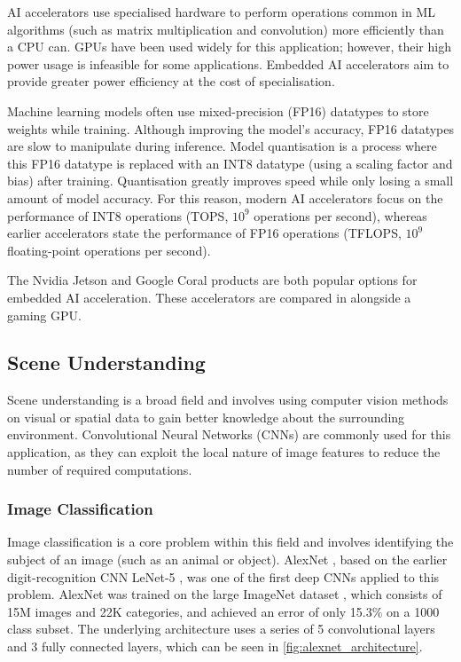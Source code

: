 AI accelerators use specialised hardware to perform operations common in ML algorithms (such as matrix multiplication
and convolution) more efficiently than a CPU can. GPUs have been used widely for this application; however, their high
power usage is infeasible for some applications. Embedded AI accelerators aim to provide greater power efficiency
at the cost of specialisation.

Machine learning models often use mixed-precision (FP16) datatypes to store weights while training.
Although improving the model's accuracy, FP16 datatypes are slow to manipulate during inference.
Model quantisation \cite{jacobQuantizationTrainingNeural2017} is a process where this FP16 datatype is replaced with an
INT8 datatype (using a scaling factor and bias) after training.
Quantisation greatly improves speed while only losing a small amount of model accuracy.
For this reason, modern AI accelerators focus on the performance of INT8 operations (TOPS, $10^9$ operations per second),
whereas earlier accelerators state the performance of FP16 operations (TFLOPS, $10^9$ floating-point
operations per second).

The Nvidia Jetson and Google Coral products are both popular options for embedded AI acceleration. These accelerators are compared
in  alongside a gaming GPU. 

\pagebreak
\subsection{Scene Understanding}
Scene understanding is a broad field and involves using computer vision methods
on visual or spatial data to gain better knowledge about the surrounding environment.
Convolutional Neural Networks (CNNs) are commonly used for this application, as they
can exploit the local nature of image features to reduce the number of required computations.

\subsubsection{Image Classification}
Image classification is a core problem within this field and involves identifying the subject of an image (such as an animal or object).
AlexNet \cite{krizhevskyImageNetClassificationDeep2012}, based on the earlier digit-recognition CNN LeNet-5
\cite{lecunGradientbasedLearningApplied1998}, was one of the first deep CNNs
applied to this problem. AlexNet was trained on the large ImageNet dataset \cite{jiadengImageNetLargescaleHierarchical2009},
which consists of 15M images and 22K categories,
and achieved an error of only 15.3\% on a 1000 class subset. The underlying architecture uses a series of 5 convolutional
layers and 3 fully connected layers, which can be seen in \cref{fig:alexnet_architecture}.

